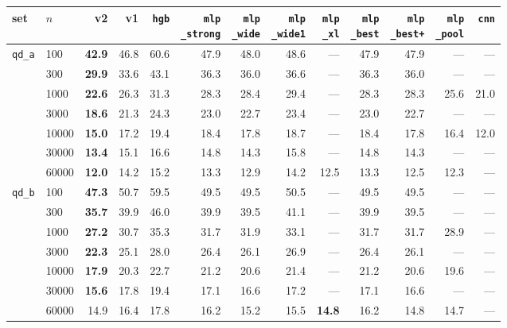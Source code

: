 \begin{tabular}{llrrrrrrrrrrr}
\toprule
set & $n$ & v2 & v1 & \texttt{hgb} & \hd{\texttt{mlp}\\\texttt{\_strong}} & \hd{\texttt{mlp}\\\texttt{\_wide}} & \hd{\texttt{mlp}\\\texttt{\_wide1}} & \hd{\texttt{mlp}\\\texttt{\_xl}} & \hd{\texttt{mlp}\\\texttt{\_best}} & \hd{\texttt{mlp}\\\texttt{\_best+}} & \hd{\texttt{mlp}\\\texttt{\_pool}} & \texttt{cnn}\\
\midrule
\texttt{qd\_a} & 100 & \textbf{42.9} & 46.8 & 60.6 & 47.9 & 48.0 & 48.6 & --- & 47.9 & 47.9 & --- & ---\\
 & 300 & \textbf{29.9} & 33.6 & 43.1 & 36.3 & 36.0 & 36.6 & --- & 36.3 & 36.0 & --- & ---\\
 & 1000 & \textbf{22.6} & 26.3 & 31.3 & 28.3 & 28.4 & 29.4 & --- & 28.3 & 28.3 & 25.6 & 21.0\\
 & 3000 & \textbf{18.6} & 21.3 & 24.3 & 23.0 & 22.7 & 23.4 & --- & 23.0 & 22.7 & --- & ---\\
 & 10000 & \textbf{15.0} & 17.2 & 19.4 & 18.4 & 17.8 & 18.7 & --- & 18.4 & 17.8 & 16.4 & 12.0\\
 & 30000 & \textbf{13.4} & 15.1 & 16.6 & 14.8 & 14.3 & 15.8 & --- & 14.8 & 14.3 & --- & ---\\
 & 60000 & \textbf{12.0} & 14.2 & 15.2 & 13.3 & 12.9 & 14.2 & 12.5 & 13.3 & 12.5 & 12.3 & ---\\
\midrule
\texttt{qd\_b} & 100 & \textbf{47.3} & 50.7 & 59.5 & 49.5 & 49.5 & 50.5 & --- & 49.5 & 49.5 & --- & ---\\
 & 300 & \textbf{35.7} & 39.9 & 46.0 & 39.9 & 39.5 & 41.1 & --- & 39.9 & 39.5 & --- & ---\\
 & 1000 & \textbf{27.2} & 30.7 & 35.3 & 31.7 & 31.9 & 33.1 & --- & 31.7 & 31.7 & 28.9 & ---\\
 & 3000 & \textbf{22.3} & 25.1 & 28.0 & 26.4 & 26.1 & 26.9 & --- & 26.4 & 26.1 & --- & ---\\
 & 10000 & \textbf{17.9} & 20.3 & 22.7 & 21.2 & 20.6 & 21.4 & --- & 21.2 & 20.6 & 19.6 & ---\\
 & 30000 & \textbf{15.6} & 17.8 & 19.4 & 17.1 & 16.6 & 17.2 & --- & 17.1 & 16.6 & --- & ---\\
 & 60000 & 14.9 & 16.4 & 17.8 & 16.2 & 15.2 & 15.5 & \textbf{14.8} & 16.2 & 14.8 & 14.7 & ---\\
\bottomrule
\end{tabular}

